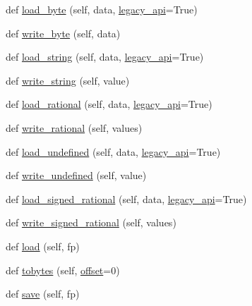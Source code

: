 \begin{DoxyCompactItemize}
\item 
def \hyperlink{classPIL_1_1TiffImagePlugin_1_1ImageFileDirectory__v2_a1e4fa8bf0fca279e418f8c064f2a5494}{load\+\_\+byte} (self, data, \hyperlink{classPIL_1_1TiffImagePlugin_1_1ImageFileDirectory__v2_a1255938aff28089f025f0c26529d0f63}{legacy\+\_\+api}=True)
\item 
def \hyperlink{classPIL_1_1TiffImagePlugin_1_1ImageFileDirectory__v2_aed586ef941a4b31d81eacd04031abab7}{write\+\_\+byte} (self, data)
\item 
def \hyperlink{classPIL_1_1TiffImagePlugin_1_1ImageFileDirectory__v2_a0d41912d04cc9fa704e632c2eace0c13}{load\+\_\+string} (self, data, \hyperlink{classPIL_1_1TiffImagePlugin_1_1ImageFileDirectory__v2_a1255938aff28089f025f0c26529d0f63}{legacy\+\_\+api}=True)
\item 
def \hyperlink{classPIL_1_1TiffImagePlugin_1_1ImageFileDirectory__v2_aea00f67cbbd8db1e44d9af7d0d84f8aa}{write\+\_\+string} (self, value)
\item 
def \hyperlink{classPIL_1_1TiffImagePlugin_1_1ImageFileDirectory__v2_aaad66cdf9710e238455a8932bfc4821f}{load\+\_\+rational} (self, data, \hyperlink{classPIL_1_1TiffImagePlugin_1_1ImageFileDirectory__v2_a1255938aff28089f025f0c26529d0f63}{legacy\+\_\+api}=True)
\item 
def \hyperlink{classPIL_1_1TiffImagePlugin_1_1ImageFileDirectory__v2_a49f71d87f2e906e73bc895cb15ec95b1}{write\+\_\+rational} (self, values)
\item 
def \hyperlink{classPIL_1_1TiffImagePlugin_1_1ImageFileDirectory__v2_aa09cfe9dbc78b0c348128ddc427bc935}{load\+\_\+undefined} (self, data, \hyperlink{classPIL_1_1TiffImagePlugin_1_1ImageFileDirectory__v2_a1255938aff28089f025f0c26529d0f63}{legacy\+\_\+api}=True)
\item 
def \hyperlink{classPIL_1_1TiffImagePlugin_1_1ImageFileDirectory__v2_ad0a67e7bf53179774eb272424248054e}{write\+\_\+undefined} (self, value)
\item 
def \hyperlink{classPIL_1_1TiffImagePlugin_1_1ImageFileDirectory__v2_adb8d7e4d97efb8d952ad743e295db066}{load\+\_\+signed\+\_\+rational} (self, data, \hyperlink{classPIL_1_1TiffImagePlugin_1_1ImageFileDirectory__v2_a1255938aff28089f025f0c26529d0f63}{legacy\+\_\+api}=True)
\item 
def \hyperlink{classPIL_1_1TiffImagePlugin_1_1ImageFileDirectory__v2_aa7893ada1ab6f0572b86ccdd5c8b7401}{write\+\_\+signed\+\_\+rational} (self, values)
\item 
def \hyperlink{classPIL_1_1TiffImagePlugin_1_1ImageFileDirectory__v2_a3799e5b6cdc5df860a0b9d2f510032c4}{load} (self, fp)
\item 
def \hyperlink{classPIL_1_1TiffImagePlugin_1_1ImageFileDirectory__v2_a7e615312a6a87a8551d147b9024b7a6c}{tobytes} (self, \hyperlink{classPIL_1_1TiffImagePlugin_1_1ImageFileDirectory__v2_a556b82fbafe8a4f39d3c3f5bcf232d61}{offset}=0)
\item 
def \hyperlink{classPIL_1_1TiffImagePlugin_1_1ImageFileDirectory__v2_ad098636344db7744df582304d7394782}{save} (self, fp)
\end{DoxyCompactItemize}
